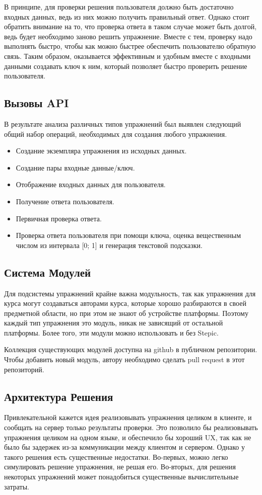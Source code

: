 \documentclass{matmex-diploma-custom}
\begin{document}
В принципе, для проверки решения пользователя должно быть достаточно
входных данных, ведь из них можно получить правильный ответ. Однако
стоит обратить внимание на то, что проверка ответа в таком случае
может быть долгой, ведь будет необходимо заново решить
упражнение. Вместе с тем, проверку надо выполнять быстро, чтобы как
можно быстрее обеспечить пользователю обратную связь. Таким образом,
оказывается эффективным и удобным вместе с входными данными создавать
ключ к ним, который позволяет быстро проверить решение пользователя.

\subsection{Вызовы API}
В результате анализа различных типов упражнений был выявлен следующий
общий набор операций, необходимых для создания любого упражнения.

\begin{itemize}
\item Создание экземпляра упражнения из исходных данных.
\item Создание пары входные данные/ключ.
\item Отображение входных данных для пользователя.
\item Получение ответа пользователя.
\item Первичная проверка ответа.
\item Проверка ответа пользователя при помощи ключа, оценка
  вещественным числом из интервала [0; 1] и генерация текстовой подсказки.
\end{itemize}

\subsection{Система Модулей}
Для подсистемы упражнений крайне важна модульность, так как упражнения
для курса могут создаваться авторами курса, которые хорошо разбираются
в своей предметной области, но при этом не знают об устройстве
платформы. Поэтому каждый тип упражнения это модуль, никак не
зависящий от остальной платформы. Более того, эти модули можно
использовать и без Stepic.

Коллекция существующих модулей доступна на github в публичном
репозитории. Чтобы добавить новый модуль, автору необходимо сделать
pull request в этот репозиторий.

\subsection{Архитектура Решения}
Привлекательной кажется идея реализовывать упражнения целиком в
клиенте, и сообщать на сервер только результаты проверки. Это
позволило бы реализовывать упражнения целиком на одном языке, и
обеспечило бы хороший UX, так как не было бы задержек из-за
коммуникации между клиентом и сервером. Однако у такого решения есть
существенные недостатки. Во-первых, можно легко симулировать решение
упражнения, не решая его. Во-вторых, для решения некоторых упражнений
может понадобиться существенные вычислительные затраты.
\end{document}
